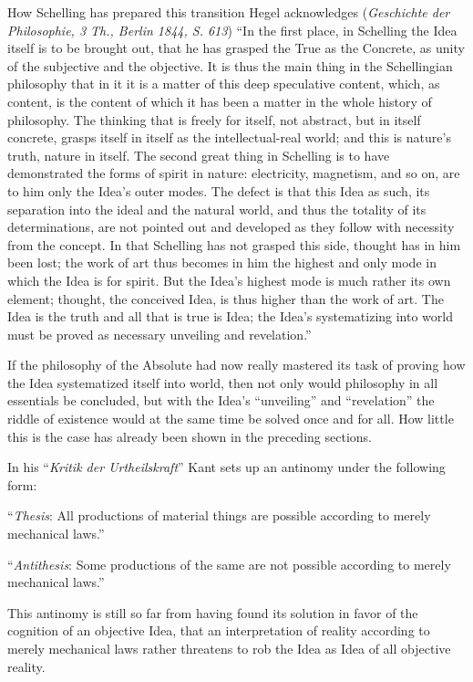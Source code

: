 \documentclass[12pt]{book}
\begin{document}
How Schelling has prepared this transition Hegel acknowledges (\textit{Geschichte der Philosophie, 3
Th., Berlin 1844, S. 613}) ``In the first place, in Schelling the Idea itself is to be brought out,
that he has grasped the True as the Concrete, as unity of the subjective and the objective. It is thus
the main thing in the Schellingian philosophy that in it it is a matter of this deep speculative
content, which, as content, is the content of which it has been a matter in the whole history of
philosophy. The thinking that is freely for itself, not abstract, but in itself concrete, grasps
itself in itself as the intellectual-real world; and this is nature's truth, nature in itself. The
second great thing in Schelling is to have demonstrated the forms of spirit in nature: electricity,
magnetism, and so on, are to him only the Idea's outer modes. The defect is that this Idea as such,
its separation into the ideal and the natural world, and thus the totality of its determinations, are
not pointed out and developed as they follow with necessity from the concept. In that Schelling has
not grasped this side, thought has in him been lost; the work of art thus becomes in him the highest
and only mode in which the Idea is for spirit. But the Idea's highest mode is much rather its own
element; thought, the conceived Idea, is thus higher than the work of art. The Idea is the truth and
all that is true is Idea; the Idea's systematizing into world must be proved as necessary unveiling
and revelation.''

If the philosophy of the Absolute had now really mastered its task of proving how the Idea
systematized itself into world, then not only would philosophy in all essentials be concluded, but
with the Idea's ``unveiling'' and ``revelation'' the riddle of existence would at the same time be
solved once
and for all. How little this is the case has already been shown in the preceding sections.

In his ``\textit{Kritik der Urtheilskraft}'' Kant sets up an antinomy under the following form:

``\emph{Thesis}: All productions of material things are possible according to merely mechanical laws.''

``\emph{Antithesis}: Some productions of the same are not possible according to merely mechanical
laws.''

This antinomy is still so far from having found its solution in favor of the cognition of an objective
Idea, that an interpretation of reality according to merely mechanical laws rather threatens to rob
the Idea as Idea of all objective reality.
\end{document}
